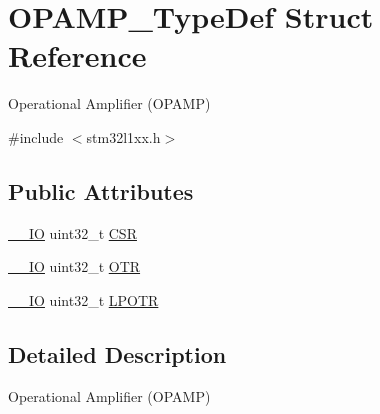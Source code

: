 \hypertarget{struct_o_p_a_m_p___type_def}{\section{O\-P\-A\-M\-P\-\_\-\-Type\-Def Struct Reference}
\label{struct_o_p_a_m_p___type_def}
}


Operational Amplifier (O\-P\-A\-M\-P)  




{\ttfamily \#include $<$stm32l1xx.\-h$>$}

\subsection*{Public Attributes}
\begin{DoxyCompactItemize}
\item 
\hyperlink{group___c_m_s_i_s__core__definitions_gaec43007d9998a0a0e01faede4133d6be}{\-\_\-\-\_\-\-I\-O} uint32\-\_\-t \hyperlink{struct_o_p_a_m_p___type_def_aa3123f8a6ca8605b6687b9ee3f11e8ef}{C\-S\-R}
\item 
\hyperlink{group___c_m_s_i_s__core__definitions_gaec43007d9998a0a0e01faede4133d6be}{\-\_\-\-\_\-\-I\-O} uint32\-\_\-t \hyperlink{struct_o_p_a_m_p___type_def_a6a80544bc693d9c51045b3652c43fd22}{O\-T\-R}
\item 
\hyperlink{group___c_m_s_i_s__core__definitions_gaec43007d9998a0a0e01faede4133d6be}{\-\_\-\-\_\-\-I\-O} uint32\-\_\-t \hyperlink{struct_o_p_a_m_p___type_def_a285131c897741d5290937f8f4f297e08}{L\-P\-O\-T\-R}
\end{DoxyCompactItemize}


\subsection{Detailed Description}
Operational Amplifier (O\-P\-A\-M\-P) 

